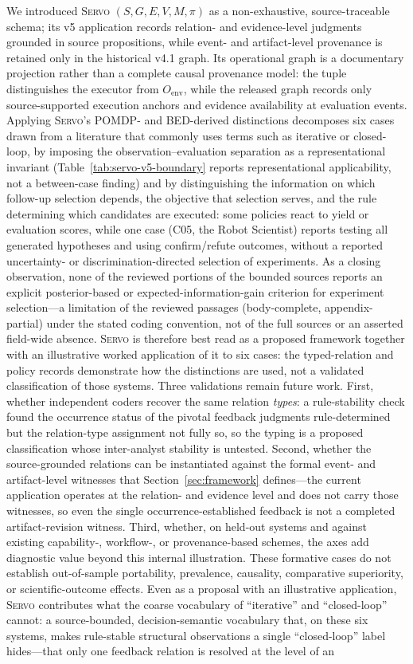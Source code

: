 \documentclass{article}
\newcommand{\sgmvpi}{$(S, G, E, V, M, \pi)$}
\newcommand{\framework}{\textsc{Servo}}
\begin{document}
We introduced \framework{} \sgmvpi{} as a non-exhaustive, source-traceable schema; its v5 application records relation- and evidence-level judgments grounded in source propositions, while event- and artifact-level provenance is retained only in the historical v4.1 graph. Its operational graph is a documentary projection rather than a complete causal provenance model: the tuple distinguishes the executor from $O_{\mathrm{env}}$, while the released graph records only source-supported execution anchors and evidence availability at evaluation events. Applying \framework{}'s POMDP- and BED-derived distinctions decomposes six cases drawn from a literature that commonly uses terms such as iterative or closed-loop, by imposing the observation--evaluation separation as a representational invariant (Table~\ref{tab:servo-v5-boundary} reports representational applicability, not a between-case finding) and by distinguishing the information on which follow-up selection depends, the objective that selection serves, and the rule determining which candidates are executed: some policies react to yield or evaluation scores, while one case (C05, the Robot Scientist) reports testing all generated hypotheses and using confirm/refute outcomes, without a reported uncertainty- or discrimination-directed selection of experiments. As a closing observation, none of the reviewed portions of the bounded sources reports an explicit posterior-based or expected-information-gain criterion for experiment selection---a limitation of the reviewed passages (body-complete, appendix-partial) under the stated coding convention, not of the full sources or an asserted field-wide absence. \framework{} is therefore best read as a proposed framework together with an illustrative worked application of it to six cases: the typed-relation and policy records demonstrate how the distinctions are used, not a validated classification of those systems. Three validations remain future work. First, whether independent coders recover the same relation \emph{types}: a rule-stability check found the occurrence status of the pivotal feedback judgments rule-determined but the relation-type assignment not fully so, so the typing is a proposed classification whose inter-analyst stability is untested. Second, whether the source-grounded relations can be instantiated against the formal event- and artifact-level witnesses that Section~\ref{sec:framework} defines---the current application operates at the relation- and evidence level and does not carry those witnesses, so even the single occurrence-established feedback is not a completed artifact-revision witness. Third, whether, on held-out systems and against existing capability-, workflow-, or provenance-based schemes, the axes add diagnostic value beyond this internal illustration. These formative cases do not establish out-of-sample portability, prevalence, causality, comparative superiority, or scientific-outcome effects. Even as a proposal with an illustrative application, \framework{} contributes what the coarse vocabulary of ``iterative'' and ``closed-loop'' cannot: a source-bounded, decision-semantic vocabulary that, on these six systems, makes rule-stable structural observations a single ``closed-loop'' label hides---that only one feedback relation is resolved at the level of an 
\end{document}
